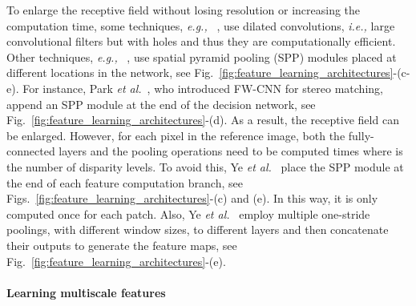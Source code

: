 \documentclass[10pt,journal,compsoc]{IEEEtran}
\newcommand{\ie}{\emph{i.e., }}
\newcommand{\eg}{\emph{e.g., }}
\newcommand{\etal}{\emph{et al.}}
\begin{document}
To enlarge the receptive field without losing resolution or increasing the computation time, some techniques, \eg~\cite{Fu_2018_CVPR}, use dilated convolutions, \ie large convolutional filters but with holes and thus they are computationally efficient. Other techniques, \eg~\cite{park2017look,ye2017efficient}, use spatial pyramid pooling (SPP) modules placed at different locations in the network, see Fig.~\ref{fig:feature_learning_architectures}-(c-e).  For instance, Park \etal~\cite{park2017look}, who introduced FW-CNN for stereo matching, append an SPP module at the end of the decision network, see Fig.~\ref{fig:feature_learning_architectures}-(d). As a result, the receptive field can be enlarged. However,  for each pixel in the reference image,  both the fully-connected layers and the pooling operations need to be computed  times where  is the number of disparity levels. To avoid this, Ye \etal~\cite{ye2017efficient} place the SPP module at the end of each feature computation branch, see   Figs.~\ref{fig:feature_learning_architectures}-(c) and (e). In this way, it is only computed once for each patch. Also, Ye \etal~\cite{ye2017efficient}  employ multiple one-stride poolings, with different window sizes, to different layers and then concatenate their outputs  to generate the feature maps, see Fig.~\ref{fig:feature_learning_architectures}-(e).


\paragraph{Learning multiscale features}
\begin{figure}[t]
\end{figure}
\end{document}
